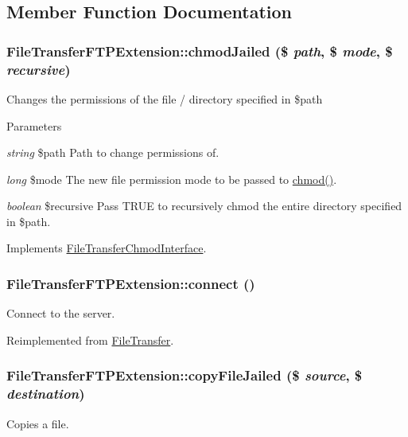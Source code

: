 \subsection{Member Function Documentation}
\hypertarget{classFileTransferFTPExtension_a7256841ba293ae42126f05a4ab3dfe82}{
\subsubsection[{chmodJailed}]{\setlength{\rightskip}{0pt plus 5cm}FileTransferFTPExtension::chmodJailed (\$ {\em path}, \/  \$ {\em mode}, \/  \$ {\em recursive})}}
\label{classFileTransferFTPExtension_a7256841ba293ae42126f05a4ab3dfe82}
Changes the permissions of the file / directory specified in \$path


\begin{DoxyParams}{Parameters}
\item[{\em string}]\$path Path to change permissions of. \item[{\em long}]\$mode The new file permission mode to be passed to \hyperlink{classFileTransfer_a7c49554b3cce3ab7cc03e2f45f9934b1}{chmod()}. \item[{\em boolean}]\$recursive Pass TRUE to recursively chmod the entire directory specified in \$path. \end{DoxyParams}


Implements \hyperlink{interfaceFileTransferChmodInterface_a031e451823be199251562369d1f760f0}{FileTransferChmodInterface}.\hypertarget{classFileTransferFTPExtension_ad79d4e7e3f1c9800f30edb387e358f22}{
\subsubsection[{connect}]{\setlength{\rightskip}{0pt plus 5cm}FileTransferFTPExtension::connect ()}}
\label{classFileTransferFTPExtension_ad79d4e7e3f1c9800f30edb387e358f22}
Connect to the server. 

Reimplemented from \hyperlink{classFileTransfer_a78b9b9fdd3029295f73a5a41e052e311}{FileTransfer}.\hypertarget{classFileTransferFTPExtension_a42ee0199e700e678579e0bd7ea51c534}{
\subsubsection[{copyFileJailed}]{\setlength{\rightskip}{0pt plus 5cm}FileTransferFTPExtension::copyFileJailed (\$ {\em source}, \/  \$ {\em destination})}}
\label{classFileTransferFTPExtension_a42ee0199e700e678579e0bd7ea51c534}
Copies a file.


